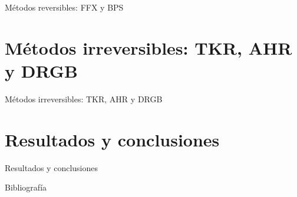 \documentclass{beamer}
\begin{document}
  \begin{frame}{Métodos reversibles: FFX y BPS}

  \end{frame}

  \section{Métodos irreversibles: TKR, AHR y DRGB}

  \begin{frame}{Métodos irreversibles: TKR, AHR y DRGB}

  \end{frame}

  \section{Resultados y conclusiones}

  \begin{frame}{Resultados y conclusiones}

  \end{frame}

  \begin{frame}[allowframebreaks]{Bibliografía}
    \printbibliography
  \end{frame}

  \setlength{\parskip}{0.0em}

  {
  \frame{\titlepage}}
\end{document}
